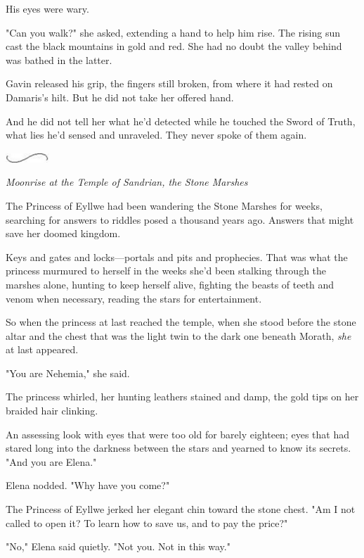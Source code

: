 His eyes were wary.

"Can you walk?"
she asked, extending a hand to help him rise.
The rising sun cast the black mountains in gold and red.
She had no doubt the valley behind was bathed in the latter.

Gavin released his grip, the fingers still broken, from where it had rested on Damaris's hilt.
But he did not take her offered hand.

And he did not tell her what he'd detected while he touched the Sword of Truth, what lies he'd sensed and unraveled.
They never spoke of them again.

\begin{center}
	\includegraphics[width=0.65in,height=0.13in]{images/seperator}
\end{center}

\emph{Moonrise at the Temple of Sandrian, the Stone Marshes}

The Princess of Eyllwe had been wandering the Stone Marshes for weeks, searching for answers to riddles posed a thousand years ago.
Answers that might save her doomed kingdom.

Keys and gates and locks---portals and pits and prophecies.
That was what the princess murmured to herself in the weeks she'd been stalking through the marshes alone, hunting to keep herself alive, fighting the beasts of teeth and venom when necessary, reading the stars for entertainment.

So when the princess at last reached the temple, when she stood before the stone altar and the chest that was the light twin to the dark one beneath Morath, \emph{she} at last appeared.

"You are Nehemia," she said.

The princess whirled, her hunting leathers stained and damp, the gold tips on her braided hair clinking.

An assessing look with eyes that were too old for barely eighteen; eyes that had stared long into the darkness between the stars and yearned to know its secrets.
"And you are Elena."

Elena nodded.
"Why have you come?"

The Princess of Eyllwe jerked her elegant chin toward the stone chest.
"Am I not called to open it?
To learn how to save us, and to pay the price?"

"No," Elena said quietly.
"Not you.
Not in this way."

